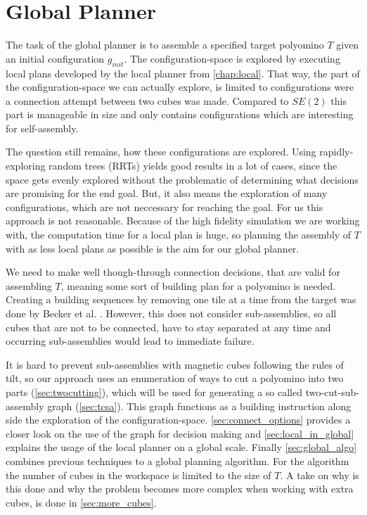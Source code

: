\chapter{Global Planner}
\label{chap:global}

The task of the global planner is to assemble a specified target polyomino $T$ given an initial configuration $g_{init}$.
The configuration-space is explored by executing local plans developed by the local planner from \autoref{chap:local}.
That way, the part of the configuration-space we can actually explore, is limited to configurations were a connection attempt between two cubes was made.
Compared to $SE(2)$ this part is manageable in size and only contains configurations which are interesting for self-assembly.

The question still remains, how these configurations are explored.
Using rapidly-exploring random trees (RRTs) \cite{lavalle1998} yields good results in a lot of cases, since the space gets evenly explored without the problematic of determining what decisions are promising for the end goal.
But, it also means the exploration of many configurations, which are not neccessary for reaching the goal.
For us this approach is not reasonable. 
Because of the high fidelity simulation we are working with, the computation time for a local plan is huge, so planning the assembly of $T$ with as less local plans as possible is the aim for our global planner.

We need to make well though-through connection decisions, that are valid for assembling $T$, meaning some sort of building plan for a polyomino is needed.
Creating a building sequences by removing one tile at a time from the target was done by Becker et al. \cite{Becker2020}.
However, this does not consider sub-assemblies, so all cubes that are not to be connected, have to stay separated at any time and occurring sub-assemblies would lead to immediate failure.

It is hard to prevent sub-assemblies with magnetic cubes following the rules of tilt, so our approach uses an enumeration of ways to cut a polyomino into two parts (\autoref{sec:twocutting}), which will be used for generating a so called two-cut-sub-assembly graph (\autoref{sec:tcsa}).
This graph functions as a building instruction along side the exploration of the configuration-space.
\autoref{sec:connect_options} provides a closer look on the use of the graph for decision making and \autoref{sec:local_in_global} explains the usage of the local planner on a global scale. 
Finally \autoref{sec:global_algo} combines previous techniques to a global planning algorithm.
For the algorithm the number of cubes in the workspace is limited to the size of $T$.
A take on why is this done and why the problem becomes more complex when working with extra cubes, is done in \autoref{sec:more_cubes}.



